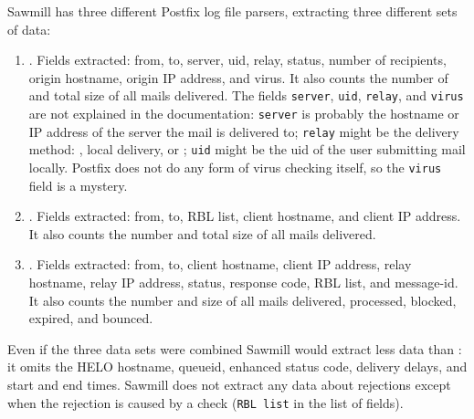Sawmill has three different Postfix log file parsers, extracting three
different sets of data:

\begin{enumerate}

    \item
        .
        Fields extracted: from, to, server, uid, relay, status, number of
        recipients, origin hostname, origin IP address, and virus.  It
        also counts the number of and total size of all mails delivered.
        The fields \texttt{server}, \texttt{uid}, \texttt{relay}, and
        \texttt{virus} are not explained in the documentation:
        \texttt{server} is probably the hostname or IP address of the
        server the mail is delivered to; \texttt{relay} might be the
        delivery method: , local delivery, or ;
        \texttt{uid} might be the uid of the user submitting mail locally.
        Postfix does not do any form of virus checking itself, so the
        \texttt{virus} field is a mystery.

    \item
        .
        Fields extracted: from, to, RBL list, client hostname, and client
        IP address.  It also counts the number and total size of all mails
        delivered.

    \item
        .
        Fields extracted: from, to, client hostname, client IP address,
        relay hostname, relay IP address, status, response code, RBL list,
        and message-id.  It also counts the number and size of all mails
        delivered, processed, blocked, expired, and bounced.

\end{enumerate}

Even if the three data sets were combined Sawmill would extract less data
than \parsername{}: it omits the HELO hostname, queueid, enhanced status
code, delivery delays, and start and end times.  Sawmill does not extract
any data about rejections except when the rejection is caused by a
 check (\texttt{RBL list} in the list of fields).

